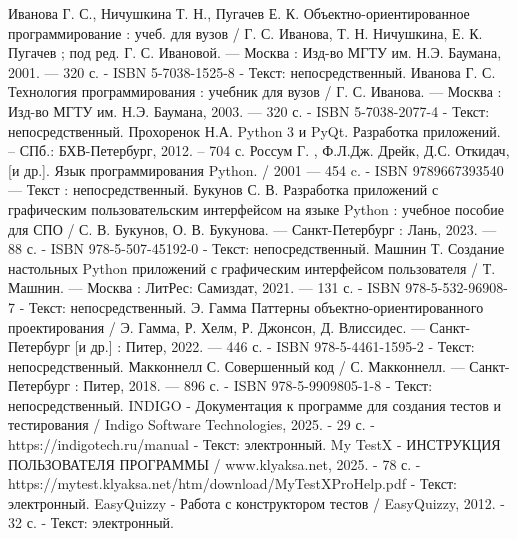\begin{thebibliography}{9}
     Иванова Г. С., Ничушкина Т. Н., Пугачев Е. К. Объектно-ориентированное программирование : учеб. для вузов / Г. С. Иванова, Т. Н. Ничушкина, Е. К. Пугачев ; под ред. Г. С. Ивановой. — Москва : Изд-во МГТУ им. Н.Э. Баумана, 2001. — 320 с. - ISBN 5-7038-1525-8 - Текст: непосредственный.
     Иванова Г. С. Технология программирования : учебник для вузов / Г. С. Иванова. — Москва : Изд-во МГТУ им. Н.Э. Баумана, 2003. — 320 с. - ISBN 5-7038-2077-4 - Текст: непосредственный.
     Прохоренок Н.А. Python 3 и PyQt. Разработка приложений. – СПб.: БХВ-Петербург, 2012. – 704 с.
     Россум Г. , Ф.Л.Дж. Дрейк, Д.С. Откидач, [и др.]. Язык программирования Python. / 2001 — 454 c. - ISBN 9789667393540  — Текст : непосредственный.
     Букунов С. В. Разработка приложений с графическим пользовательским интерфейсом на языке Python : учебное пособие для СПО / С. В. Букунов, О. В. Букунова. — Санкт-Петербург : Лань, 2023. — 88 с. - ISBN 978-5-507-45192-0 - Текст: непосредственный.
     Машнин Т. Создание настольных Python приложений с графическим интерфейсом пользователя / Т. Машнин. — Москва : ЛитРес: Самиздат, 2021. — 131 с. - ISBN 978-5-532-96908-7 - Текст: непосредственный.
     Э. Гамма Паттерны объектно-ориентированного проектирования / Э. Гамма, Р. Хелм, Р. Джонсон, Д. Влиссидес. — Санкт-Петербург [и др.] : Питер, 2022. — 446 с. - ISBN 978-5-4461-1595-2 - Текст: непосредственный.
     Макконнелл С. Совершенный код / С. Макконнелл. — Санкт-Петербург : Питер, 2018. — 896 с. - ISBN 978-5-9909805-1-8 - Текст: непосредственный.
     INDIGO - Документация к программе для создания тестов и тестирования / Indigo Software Technologies, 2025. - 29 с. - https://indigotech.ru/manual - Текст: электронный.
     My TestX - ИНСТРУКЦИЯ ПОЛЬЗОВАТЕЛЯ ПРОГРАММЫ / www.klyaksa.net, 2025. - 78 с. - https://mytest.klyaksa.net/htm/download/MyTestXProHelp.pdf - Текст: электронный.
     EasyQuizzy - Работа с конструктором тестов / EasyQuizzy, 2012. - 32 с. - Текст: электронный.
    
\end{thebibliography}
